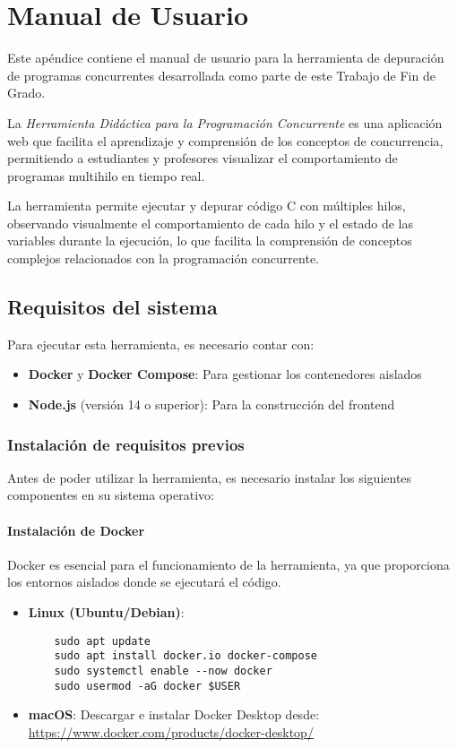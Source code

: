 \chapter{Manual de Usuario}\label{app:manual}

Este apéndice contiene el manual de usuario para la herramienta de depuración de programas concurrentes desarrollada como parte de este Trabajo de Fin de Grado.

La \textit{Herramienta Didáctica para la Programación Concurrente} es una aplicación web que facilita el aprendizaje y comprensión de los conceptos de concurrencia, permitiendo a estudiantes y profesores visualizar el comportamiento de programas multihilo en tiempo real.

La herramienta permite ejecutar y depurar código C con múltiples hilos, observando visualmente el comportamiento de cada hilo y el estado de las variables durante la ejecución, lo que facilita la comprensión de conceptos complejos relacionados con la programación concurrente.

\section{Requisitos del sistema}

Para ejecutar esta herramienta, es necesario contar con:
\begin{itemize}
    \item \textbf{Docker} y \textbf{Docker Compose}: Para gestionar los contenedores aislados
    \item \textbf{Node.js} (versión 14 o superior): Para la construcción del frontend
\end{itemize}

\subsection{Instalación de requisitos previos}

Antes de poder utilizar la herramienta, es necesario instalar los siguientes componentes en su sistema operativo:

\subsubsection{Instalación de Docker}

Docker es esencial para el funcionamiento de la herramienta, ya que proporciona los entornos aislados donde se ejecutará el código.

\begin{itemize}
    \item \textbf{Linux (Ubuntu/Debian)}:
    \begin{verbatim}
    sudo apt update
    sudo apt install docker.io docker-compose
    sudo systemctl enable --now docker
    sudo usermod -aG docker $USER
    \end{verbatim}
    
    \item \textbf{macOS}:
    Descargar e instalar Docker Desktop desde: \url{https://www.docker.com/products/docker-desktop/}
    
\end{itemize}

